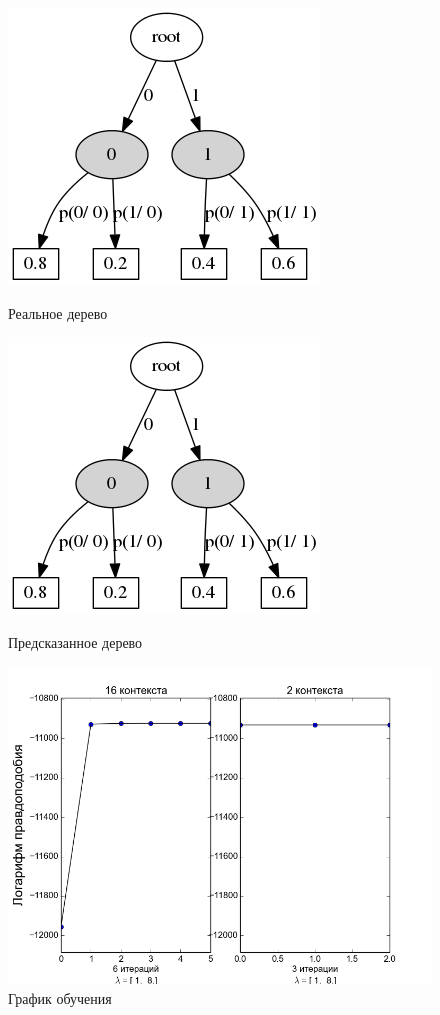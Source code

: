 \documentclass{matmex-diploma-custom}
\begin{document}
\begin{figure}[h!]\centering
\begin{minipage}[b]{0.49 \textwidth}
	\includegraphics[scale=0.4]{img/sample_hmm1/real_trie_.png}
	\centering
	\caption{ Реальное дерево }
	\label{ris:sample_hmm1_real_trie}
\end{minipage}
\hfil \hfil%
\begin{minipage}[b]{0.49 \textwidth}
	\includegraphics[scale=0.4]{img/sample_hmm1/predicted_trie.png}
	\centering
	\caption{ Предсказанное дерево }
	\label{ris:sample_hmm1_predicted_trie}
\end{minipage}
\begin{minipage}[b]{0.8 \textwidth}
	\includegraphics[scale=0.4]{img/sample_hmm1/plot_.png}
	\centering
	\caption{ График обучения }
	\label{ris:sample_hmm1_log_likelihood}
\end{minipage}
\end{figure}
\end{document}
